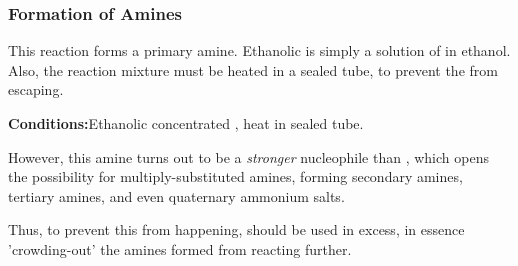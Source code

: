 			\subsubsection{Formation of Amines}

				This reaction forms a primary amine. Ethanolic  is simply a solution of  in ethanol. Also, the reaction
				mixture must be heated in a sealed tube, to prevent the  from escaping.

				\vspace{1.5em}
				\vbox{\textbf{Conditions:}\tabto{35mm}Ethanolic concentrated , heat in sealed tube.}



				However, this amine turns out to be a \textit{stronger} nucleophile than ,
				which opens the possibility for multiply-substituted amines, forming secondary amines, tertiary amines, and even
				quaternary ammonium salts.


				Thus, to prevent this from happening,  should be used in excess, in essence 'crowding-out' the amines formed
				from reacting further.




